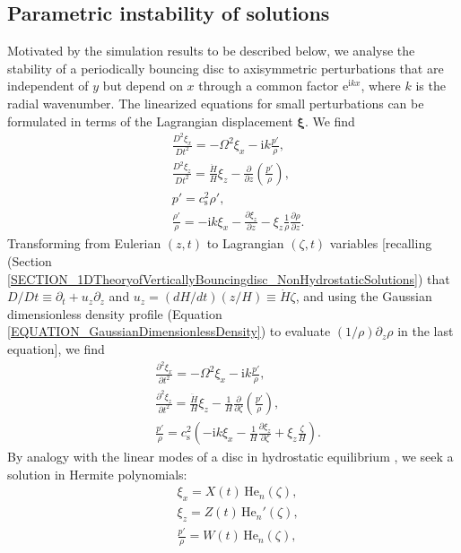 \documentclass[fleqn,usenatbib]{mnras}
\newcommand{\ee}{\mathrm{e}}
\newcommand{\ii}{\mathrm{i}}
\begin{document}
\subsection{Parametric instability of solutions}
\label{SECTION_ParametricInstabilityTheory}
Motivated by the simulation results to be described below, we analyse the stability of a periodically bouncing disc to axisymmetric perturbations that are independent of $y$ but depend on $x$ through a common factor $\ee^{\ii kx}$, where $k$ is the radial wavenumber. The linearized equations for small perturbations can be formulated in terms of the Lagrangian displacement $\boldsymbol{\xi}$. We find
\begin{align}
  &\frac{D^2\xi_x}{D t^2}=-\Omega^2\xi_x-\ii k\frac{p'}{\rho},\\
  &\frac{D^2\xi_z}{D t^2}=\frac{\ddot H}{H}\xi_z-\frac{\partial}{\partial z}\left(\frac{p'}{\rho}\right),\\
  &p'=c_\text{s}^2\rho',\\
  &\frac{\rho'}{\rho}=-\ii k\xi_x-\frac{\partial\xi_z}{\partial z}-\xi_z\frac{1}{\rho}\frac{\partial\rho}{\partial z}.
\end{align}
Transforming from Eulerian $(z,t)$ to Lagrangian $(\zeta,t)$ variables [recalling (Section \ref{SECTION_1DTheoryofVerticallyBouncingdisc_NonHydrostaticSolutions}) that $D/Dt \equiv \partial_t + u_z \partial_z$ and $u_z = (dH/dt)(z/H) \equiv \dot{H} \zeta$, and using the Gaussian dimensionless density profile (Equation \ref{EQUATION_GaussianDimensionlessDensity}) to evaluate $(1/\rho)\partial_z \rho$ in the last equation], we find
\begin{align}
  &\frac{\partial^2\xi_x}{\partial t^2}=-\Omega^2\xi_x-\ii k\frac{p'}{\rho},\\
  &\frac{\partial^2\xi_z}{\partial t^2}=\frac{\ddot H}{H}\xi_z-\frac{1}{H}\frac{\partial}{\partial\zeta}\left(\frac{p'}{\rho}\right),\\
  &\frac{p'}{\rho}=c_\text{s}^2\left(-\ii k\xi_x-\frac{1}{H}\frac{\partial\xi_z}{\partial\zeta}+\xi_z\frac{\zeta}{H}\right).
\end{align}
By analogy with the linear modes of a disc in hydrostatic equilibrium \citep{okazaki1987gloval}, we seek a solution in Hermite polynomials:
\begin{align}
  &\xi_x=X(t)\,\text{He}_n(\zeta),\\
  &\xi_z=Z(t)\,\text{He}_n'(\zeta),\\
  &\frac{p'}{\rho}=W(t)\,\text{He}_n(\zeta),
\end{align}
\end{document}

